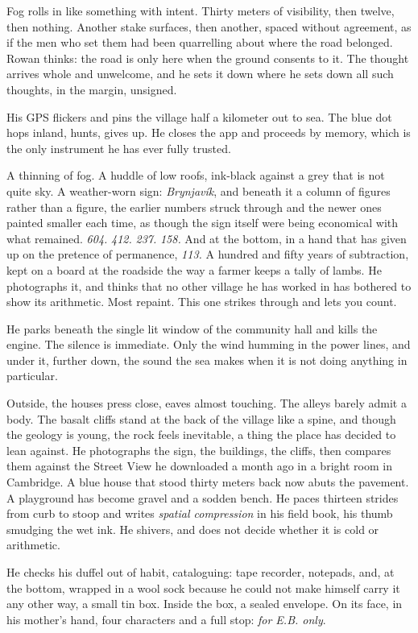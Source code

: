 \documentclass[11pt,oneside]{book}
\begin{document}
Fog rolls in like something with intent. Thirty meters of visibility,
then twelve, then nothing. Another stake surfaces, then another, spaced
without agreement, as if the men who set them had been quarrelling about
where the road belonged. Rowan thinks: the road is only here when the
ground consents to it. The thought arrives whole and unwelcome, and he
sets it down where he sets down all such thoughts, in the margin,
unsigned.

His GPS flickers and pins the village half a kilometer out to sea. The
blue dot hops inland, hunts, gives up. He closes the app and proceeds by
memory, which is the only instrument he has ever fully trusted.

A thinning of fog. A huddle of low roofs, ink-black against a grey that
is not quite sky. A weather-worn sign: \emph{Brynjavík}, and beneath it
a column of figures rather than a figure, the earlier numbers struck
through and the newer ones painted smaller each time, as though the sign
itself were being economical with what remained. \emph{604.} \emph{412.}
\emph{237.} \emph{158.} And at the bottom, in a hand that has given up
on the pretence of permanence, \emph{113.} A hundred and fifty years of
subtraction, kept on a board at the roadside the way a farmer keeps a
tally of lambs. He photographs it, and thinks that no other village he
has worked in has bothered to show its arithmetic. Most repaint. This
one strikes through and lets you count.

He parks beneath the single lit window of the community hall and kills the
engine. The silence is immediate. Only the wind humming in the power
lines, and under it, further down, the sound the sea makes when it is
not doing anything in particular.

Outside, the houses press close, eaves almost touching. The alleys
barely admit a body. The basalt cliffs stand at the back of the village
like a spine, and though the geology is young, the rock feels
inevitable, a thing the place has decided to lean against. He
photographs the sign, the buildings, the cliffs, then compares them
against the Street View he downloaded a month ago in a bright room in
Cambridge. A blue house that stood thirty meters back now abuts the
pavement. A playground has become gravel and a sodden bench. He paces
thirteen strides from curb to stoop and writes \emph{spatial
compression} in his field book, his thumb smudging the wet ink. He
shivers, and does not decide whether it is cold or arithmetic.

He checks his duffel out of habit, cataloguing: tape recorder, notepads,
and, at the bottom, wrapped in a wool sock because he could not make
himself carry it any other way, a small tin box. Inside the box, a
sealed envelope. On its face, in his mother's hand, four characters and
a full stop: \emph{for E.B. only}.
\end{document}
